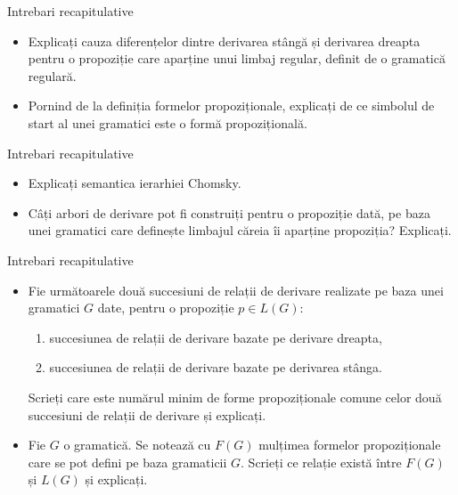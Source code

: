 \documentclass[pdf]{beamer}
\begin{document}
\begin{frame}{Intrebari recapitulative}
\begin{itemize}

\item
Explicați cauza diferențelor dintre derivarea stângă și derivarea dreapta pentru o propoziție care aparține unui limbaj regular, definit de o gramatică regulară.
\newline

\item
Pornind de la definiția formelor propoziționale, explicați de ce simbolul de start al unei gramatici este o formă propozițională.

\end{itemize}
\end{frame}



\begin{frame}{Intrebari recapitulative}
\begin{itemize}

\item
Explicați semantica ierarhiei Chomsky.
\newline

\item
Câți arbori de derivare pot fi construiți pentru o propoziție dată, pe baza unei gramatici care definește limbajul căreia îi aparține propoziția? Explicați.
\newline

\end{itemize}
\end{frame}



\begin{frame}{Intrebari recapitulative}
\begin{itemize}

\item
Fie următoarele două succesiuni de relații de derivare realizate pe baza unei gramatici $G$ date, pentru o propoziție $p \in L(G)$:

\begin{enumerate}
\item
succesiunea de relații de derivare bazate pe derivare dreapta,
\item
succesiunea de relații de derivare bazate pe derivarea stânga.
\end{enumerate}

Scrieți care este numărul minim de forme propoziționale comune celor două succesiuni de relații de derivare și explicați.
\newline

\item
Fie $G$ o gramatică. Se notează cu $F(G)$ mulțimea formelor propoziționale care se pot defini pe baza gramaticii $G$. Scrieți ce relație există între $F(G)$ și $L(G)$ și explicați.

\end{itemize}
\end{frame}
\end{document}
